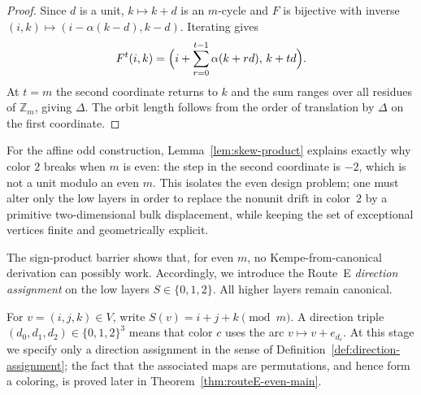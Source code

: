 \documentclass[11pt]{article}
\begin{document}
\begin{proof}
Since $d$ is a unit, $k\mapsto k+d$ is an $m$-cycle and $F$ is bijective with inverse $(i,k)\mapsto(i-\alpha(k-d),k-d)$.
Iterating gives
\[
F^t(i,k)=\Bigl(i+\sum_{r=0}^{t-1}\alpha(k+rd),\,k+td\Bigr).
\]
At $t=m$ the second coordinate returns to $k$ and the sum ranges over all residues of $\mathbb Z_m$, giving $\Delta$.
The orbit length follows from the order of translation by $\Delta$ on the first coordinate.
\end{proof}

For the affine odd construction, Lemma~\ref{lem:skew-product} explains exactly why color $2$ breaks when $m$ is even: the step in the second coordinate is $-2$, which is not a unit modulo an even $m$.
This isolates the even design problem; one must alter only the low layers in order to replace the nonunit drift in color~$2$ by a primitive two-dimensional bulk displacement, while keeping the set of exceptional vertices finite and geometrically explicit.

The sign-product barrier shows that, for even $m$, no Kempe-from-canonical derivation can possibly work.
Accordingly, we introduce the Route~E \emph{direction assignment} on the low layers $S\in\{0,1,2\}$.
All higher layers remain canonical.

For $v=(i,j,k)\in V$, write $S(v)=i+j+k\pmod m$.
A direction triple $(d_0,d_1,d_2)\in\{0,1,2\}^3$ means that color $c$ uses the arc $v\mapsto v+e_{d_c}$.
At this stage we specify only a direction assignment in the sense of Definition~\ref{def:direction-assignment}; the fact that the associated maps are permutations, and hence form a coloring, is proved later in Theorem~\ref{thm:routeE-even-main}.
\end{document}
